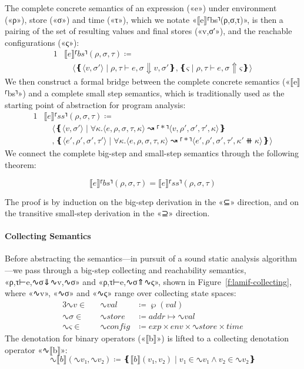 The complete concrete semantics of an expression («e») under environment («ρ»),
store («σ») and time («τ»), which we notate «⟦e⟧⸢bs⸣(ρ,σ,τ)», is then a pairing
of the set of resulting values and final stores («v,σ′»), and the reachable
configurations («ς»):
\begin{alignat*}{1}
  & ⟦e⟧⸢bs⸣(ρ,σ,τ) ≔ \\
  & \hspace{1em}⟨❴⟨v,σ′⟩ ∣ ρ,τ⊢e,σ⇓v,σ′❵,❴ς ∣ ρ,τ⊢e,σ⇑ς❵⟩
\end{alignat*}
We then construct a formal bridge between the complete concrete semantics
(«⟦e⟧⸢bs⸣») and a complete small step semantics, which is traditionally used as
the starting point of abstraction for program analysis:
\begin{alignat*}{1}
  & ⟦e⟧⸢ss⸣(ρ,σ,τ) ≔ \\
  & \hspace{1em}⟨❴⟨v,σ′⟩ ∣ ∀κ. ⟨e,ρ,σ,τ,κ⟩ ↝⸢*⸣ ⟨v,ρ′,σ′,τ′,κ⟩❵ \\
  & \hspace{1em},❴⟨e′,ρ′,σ′,τ′⟩ ∣ ∀κ. ⟨e,ρ,σ,τ,κ⟩ ↝⸢*⸣ ⟨e′,ρ′,σ′,τ′,κ′⧺κ⟩❵⟩
\end{alignat*}
We connect the complete big-step and small-step semantics through the following
theorem:
\begin{theorem}
  \[ ⟦e⟧⸢bs⸣(ρ,σ,τ) = ⟦e⟧⸢ss⸣(ρ,σ,τ) \]
\end{theorem}
The proof is by induction on the big-step derivation in the «⊆» direction, and
on the transitive small-step derivation in the «⊇» direction.

\paragraph{Collecting Semantics}

Before abstracting the semantics—in pursuit of a sound static analysis
algorithm—we pass through a big-step collecting and reachability semantics,
«ρ,τ⊢e,∿{σ}⇓∿{v},∿{σ}» and «ρ,τ⊢e,∿{σ}⇑∿{ς}», shown in
Figure~\ref{f:lamif-collecting}, where «∿{v}», «∿{σ}» and «∿{ς}» range over
collecting state spaces:
\begin{alignat*}{3}
    ∿{v} ∈ &&\mathrel{} ∿{val}      &\mathrel{} ≔ ℘(val) \\
    ∿{σ} ∈ &&\mathrel{} ∿{store}    &\mathrel{} ≔ addr ↦ ∿{val} \\
    ∿{ς} ∈ &&\mathrel{} ∿{config}   &\mathrel{} ≔ exp × env × ∿{store} × time
\end{alignat*}
The denotation for binary operators («⟦b⟧») is lifted to a collecting
denotation operator «∿{⟦b⟧}»:
\[ ∿{⟦b⟧}(∿{v}₁,∿{v}₂) ≔ ❴⟦b⟧(v₁,v₂) ∣ v₁ ∈ ∿{v}₁ ∧ v₂ ∈ ∿{v}₂❵ \]

